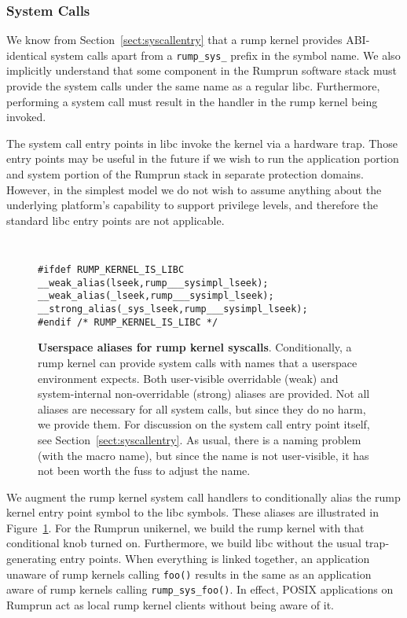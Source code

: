\subsubsection*{System Calls}

We know from Section~\ref{sect:syscallentry} that a rump kernel provides
ABI-identical system calls apart from a \verb+rump_sys_+ prefix in the
symbol name.  We also implicitly understand that some component in the
Rumprun software stack must provide the system calls under the same name
as a regular libc.  Furthermore, performing a system call must result
in the handler in the rump kernel being invoked.

The system call entry points in libc invoke the kernel via a hardware
trap.  Those entry points may be useful in the future if we wish to
run the application portion and system portion of the Rumprun stack in
separate protection domains.  However, in the simplest model we do not
wish to assume anything about the underlying platform's capability to
support privilege levels, and therefore the standard libc entry points
are not applicable.

\begin{figure}[t]
{\tt \scriptsize
\begin{verbatim}
#ifdef RUMP_KERNEL_IS_LIBC
__weak_alias(lseek,rump___sysimpl_lseek);
__weak_alias(_lseek,rump___sysimpl_lseek);
__strong_alias(_sys_lseek,rump___sysimpl_lseek);
#endif /* RUMP_KERNEL_IS_LIBC */
\end{verbatim}}
\caption[Userspace aliases for rump kernel syscalls]
{\textbf{Userspace aliases for rump kernel syscalls}.
Conditionally, a rump kernel can provide system calls with names that
a userspace environment expects.  Both user-visible overridable (weak)
and system-internal non-overridable (strong) aliases are provided.
Not all aliases are necessary for all system calls, but since they do
no harm, we provide them.  For discussion on the system call entry
point itself, see Section~\ref{sect:syscallentry}.  As usual,
there is a naming problem (with the macro name), but since the name
is not user-visible, it has not been worth the fuss to adjust the name.
}
\label{fig:rumpkernelislibc}
\end{figure}

We augment the rump kernel system call handlers to conditionally alias
the rump kernel entry point symbol to the libc symbols.  These aliases
are illustrated in Figure~\ref{fig:rumpkernelislibc}.  For the Rumprun
unikernel, we build the rump kernel with that conditional knob turned on.
Furthermore, we build libc without the usual trap-generating entry points.
When everything is linked together, an application unaware of rump kernels
calling \verb+foo()+ results in the same as an application aware of rump
kernels calling \verb+rump_sys_foo()+.  In effect, POSIX applications
on Rumprun act as local rump kernel clients without being aware of it.


